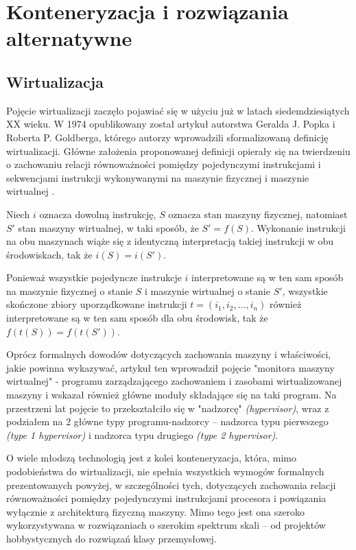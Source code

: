 
\section{Konteneryzacja i rozwiązania alternatywne}
\subsection{Wirtualizacja}
Pojęcie wirtualizacji zaczęło pojawiać się w użyciu już w latach siedemdziesiątych XX wieku. W 1974 opublikowany został artykuł autorstwa Geralda J. Popka i Roberta P. Goldberga, którego autorzy wprowadzili sformalizowaną definicję wirtualizacji. Główne założenia proponowanej definicji opierały się na twierdzeniu o zachowaniu relacji równoważności pomiędzy pojedynczymi instrukcjami i sekwencjami instrukcji wykonywanymi na maszynie fizycznej i maszynie wirtualnej \cite{virtualization}.

\begin{lemat}
	Niech $i$ oznacza dowolną instrukcję, $S$ oznacza stan maszyny fizycznej, natomiast $S'$ stan maszyny wirtualnej, w taki sposób, że $S' = f(S)$. Wykonanie instrukcji na obu maszynach wiąże się z identyczną interpretacją takiej instrukcji w obu środowiskach, tak że $i(S) = i(S')$.
\end{lemat}

\begin{lemat}
	Ponieważ wszystkie pojedyncze instrukcje $i$ interpretowane są w ten sam sposób na maszynie fizycznej o stanie $S$ i maszynie wirtualnej o stanie $S'$, wszystkie skończone zbiory uporządkowane instrukcji $t = (i_1, i_2, \ldots, i_n)$ również interpretowane są w ten sam sposób dla obu środowisk, tak że $f(t(S)) = f(t(S'))$.
\end{lemat}

\noindent Oprócz formalnych dowodów dotyczących zachowania maszyny i właściwości, jakie powinna wykazywać, artykuł ten wprowadził pojęcie "monitora maszyny wirtualnej" - programu zarządzającego zachowaniem i zasobami wirtualizowanej maszyny i wskazał również główne moduły składające się na taki program. Na przestrzeni lat pojęcie to przekształciło się w "nadzorcę" \textit{(hypervisor)}, wraz z podziałem na 2 główne typy programu-nadzorcy -- nadzorca typu pierwszego \textit{(type 1 hypervisor)} i nadzorca typu drugiego \textit{(type 2 hypervisor)}.

\noindent O wiele młodszą technologią jest z kolei konteneryzacja, która, mimo podobieństwa do wirtualizacji, nie spełnia wszystkich wymogów formalnych prezentowanych powyżej, w szczególności tych, dotyczących zachowania relacji równoważności pomiędzy pojedynczymi instrukcjami procesora i powiązania wyłącznie z architekturą fizyczną maszyny. Mimo tego jest ona szeroko wykorzystywana w rozwiązaniach o szerokim spektrum skali -- od projektów hobbystycznych do rozwiązań klasy przemysłowej.

